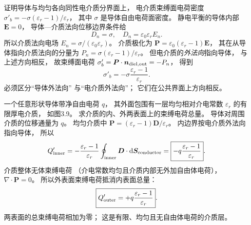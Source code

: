 证明导体与均匀各向同性电介质分界面上，
电介质束缚面电荷密度
$\sigma'_b=-\sigma(\varepsilon_r-1)/\varepsilon_r$，
其中 $\sigma$ 是导体自由电荷面密度。
\exsolution
静电平衡的导体内部 $\bm E=0$，
导体—介质法向位移边界条件给
\[
D_n=\sigma,
\quad D_n=\varepsilon_0\varepsilon_r E_n.
\]
所以介质法向电场
$E_n=\sigma/(\varepsilon_0\varepsilon_r)$。
介质极化为
$\bm P=\varepsilon_0(\varepsilon_r-1)\bm E$，
其在从导体指向介质法向的分量为
$P_n=\sigma(\varepsilon_r-1)/\varepsilon_r$。
但电介质的\emph{外法向}指向导体，
与上述方向相反，
故束缚面电荷
$\sigma'_b=\bm P\cdot\bm n_{\rm diel,out}=-P_n$，
得到
\[
\boxed{\sigma'_b=
-\sigma\frac{\varepsilon_r-1}{\varepsilon_r}}.
\]
\excheck 必须区分“导体外法向”
与“电介质外法向”；
它们在公共界面上方向相反。

一个任意形状导体带净自由电荷 $q$，
其外面包围有一层均匀相对介电常数
$\varepsilon_r$ 的有限厚电介质，
如图3.9。
求介质的内、外两表面上的束缚电荷总量。
\exsolution
导体对周围介质的位移通量为 $q$。
均匀介质中
$\bm P=(\varepsilon_r-1)\bm D/\varepsilon_r$。
内边界按电介质外法向指向导体，
所以
\[
Q'_{\rm inner}=
-\frac{\varepsilon_r-1}{\varepsilon_r}
\oint_{\rm inner}\bm D\cdot\mathrm d\bm S_{\rm conductor}
=\boxed{-q\frac{\varepsilon_r-1}{\varepsilon_r}}.
\]
介质整体无体束缚电荷
（介电常数均匀且介质内部无外加自由体电荷），
$\nabla\cdot\bm P=0$。
所以外表面束缚电荷抵消内表面总量：
\[
\boxed{Q'_{\rm outer}=
+q\frac{\varepsilon_r-1}{\varepsilon_r}}.
\]
\excheck 两表面的总束缚电荷相加为零；
这是有限、均匀且无自由体电荷的介质层。

